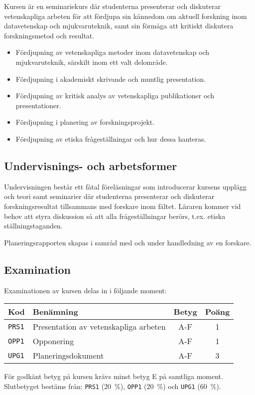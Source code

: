 Kursen är en seminariekurs där studenterna presenterar och diskuterar
vetenskapliga arbeten för att fördjupa sin kännedom om aktuell forskning
inom datavetenskap och mjukvaruteknik, samt sin förmåga att kritiskt
diskutera forskningsmetod och resultat.

\begin{itemize}
\tightlist
\item
  Fördjupning av vetenskapliga metoder inom datavetenskap och
  mjukvaruteknik, särskilt inom ett valt delområde.
\item
  Fördjupning i akademiskt skrivande och muntlig presentation.
\item
  Fördjupning av kritisk analys av vetenskapliga publikationer och
  presentationer.
\item
  Fördjupning i planering av forskningsprojekt.
\item
  Fördjupning av etiska frågeställningar och hur dessa hanteras.
\end{itemize}

\subsection*{Undervisnings- och
arbetsformer}

Undervisningen består ett fåtal föreläsningar som introducerar kursens
upplägg och teori samt seminarier där studenterna presenterar och
diskuterar forskningsresultat tillsammans med forskare inom fältet.
Läraren kommer vid behov att styra diskussion så att alla
frågeställningar berörs, t.ex. etiska ställningstaganden.

Planeringsrapporten skapas i samråd med och under handledning av en
forskare.

\subsection*{Examination}

Examinationen av kursen delas in i följande moment:

\begin{longtable}[]{@{}llcc@{}}
\toprule
\textsf{Kod} & \textsf{Benämning} & \textsf{Betyg} & \textsf{Poäng}\tabularnewline
\midrule
\endhead
\texttt{PRS1} & Presentation av vetenskapliga arbeten & A-F & 1\tabularnewline
\texttt{OPP1} & Opponering & A-F & 1\tabularnewline
\texttt{UPG1} & Planeringsdokument & A-F & 3\tabularnewline
\bottomrule
\end{longtable}

För godkänt betyg på kursen krävs minst betyg E på samtliga moment.
Slutbetyget bestäms från: \texttt{PRS1} (20~\%), \texttt{OPP1} (20~\%) och \texttt{UPG1} (60~\%).

